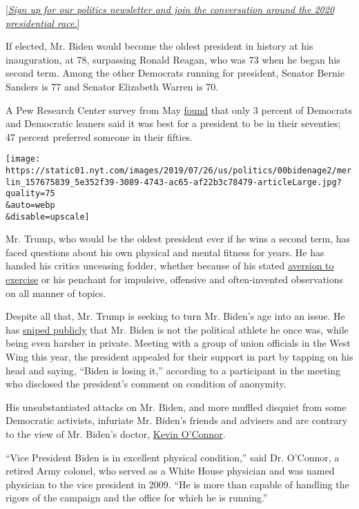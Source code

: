 {[}\href{https://www.nytimes.com/newsletters/politics?smid=rd?action=click\&module=Intentional\&pgtype=Article}{\emph{Sign
up for our politics newsletter and join the conversation around the 2020
presidential race.}}{]}

If elected, Mr. Biden would become the oldest president in history at
his inauguration, at 78, surpassing Ronald Reagan, who was 73 when he
began his second term. Among the other Democrats running for president,
Senator Bernie Sanders is 77 and Senator Elizabeth Warren is 70.

A Pew Research Center survey from May
\href{https://www.people-press.org/2019/05/23/nearly-half-of-democrats-say-the-best-age-for-a-president-is-in-their-50s/}{found}
that only 3 percent of Democrats and Democratic leaners said it was best
for a president to be in their seventies; 47 percent preferred someone
in their fifties.

\texttt{[image: https://static01.nyt.com/images/2019/07/26/us/politics/00bidenage2/merlin\_157675839\_5e352f39-3089-4743-ac65-af22b3c78479-articleLarge.jpg?quality=75\\\&auto=webp\\\&disable=upscale]}

Mr. Trump, who would be the oldest president ever if he wins a second
term, has faced questions about his own physical and mental fitness for
years. He has handed his critics unceasing fodder, whether because of
his stated
\href{https://www.nytimes.com/2019/02/14/us/politics/trump-obese.html}{aversion
to exercise} or his penchant for impulsive, offensive and often-invented
observations on all manner of topics.

Despite all that, Mr. Trump is seeking to turn Mr. Biden's age into an
issue. He has
\href{https://www.nytimes.com/2019/06/11/us/politics/iowa-trump-biden.html}{sniped
publicly} that Mr. Biden is not the political athlete he once was, while
being even harsher in private. Meeting with a group of union officials
in the West Wing this year, the president appealed for their support in
part by tapping on his head and saying, ``Biden is losing it,''
according to a participant in the meeting who disclosed the president's
comment on condition of anonymity.

His unsubstantiated attacks on Mr. Biden, and more muffled disquiet from
some Democratic activists, infuriate Mr. Biden's friends and advisers
and are contrary to the view of Mr. Biden's doctor,
\href{https://www.gwdocs.com/find-a-doctor/kevin-oconnor-do/}{Kevin
O'Connor}.

``Vice President Biden is in excellent physical condition,'' said Dr.
O'Connor, a retired Army colonel, who served as a White House physician
and was named physician to the vice president in 2009. ``He is more than
capable of handling the rigors of the campaign and the office for which
he is running.''

